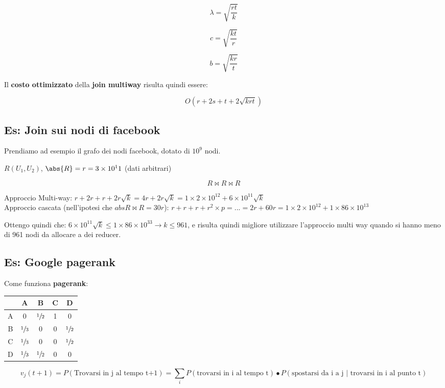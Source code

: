 \documentclass[\main/main.tex]{subfiles}
\begin{document}
\[
	\lambda = \sqrt{\dfrac{rt}{k}}
\]

\[
	c = \sqrt{\dfrac{kt}{r}}
\]

\[
	b = \sqrt{\dfrac{kr}{t}}
\]

Il \textbf{costo ottimizzato} della \textbf{join multiway} risulta quindi essere:

\[
	O(r+2s+t+2\sqrt{krt})
\]

\subsection{Es: Join sui nodi di facebook}
Prendiamo ad esempio il grafo dei nodi facebook, dotato di $10^9$ nodi.

$R(U_1, U_2)$, $\abs{R} = r = 3\times10^11$ (dati arbitrari)

\[
	R\Join R \Join R
\]

Approccio Multi-way: $r+2r + r + 2r\sqrt{k} = 4r + 2r\sqrt{k} = 1\times 2\times 10^12 + 6\times 10^11 \sqrt{k}$
\\
Approccio cascata (nell'ipotesi che $abs{R \Join R} = 30r$): $r + r + r + r^2\times p = ... = 2r + 60r = 1 \times 2 \times 10^12 + 1\times 86 \times 10^13$

Ottengo quindi che: $6\times 10^11 \sqrt{k} \leq 1\times 86 \times 10^33 \longrightarrow k \leq 961$, e risulta quindi migliore utilizzare l'approccio multi way quando si hanno meno di 961 nodi da allocare a dei reducer.

\subsection{Es: Google pagerank}
Come funziona \textbf{pagerank}:

\begin{center}
\begin{tabular}{ |c|c|c|c|c| }
 \hline
  & A & B & C & D \\
 \hline
 A & 0 & $\sfrac{1}{2}$ & 1 & 0 \\
 \hline
 B & $\sfrac{1}{3}$ & 0 & 0 & $\sfrac{1}{2}$ \\
 \hline
 C & $\sfrac{1}{3}$ & 0 & 0 & $\sfrac{1}{2}$ \\
 \hline
 D & $\sfrac{1}{3}$ & $\sfrac{1}{2}$ & 0 & 0 \\
 \hline
\end{tabular}
\end{center}

\[
	v_j(t+1) = P(\text{Trovarsi in j al tempo t+1}) = \sum_i P (\text{trovarsi in i al tempo t})\bullet P(\text{spostarsi da i a j | trovarsi in i al punto t})
\]
\end{document}
